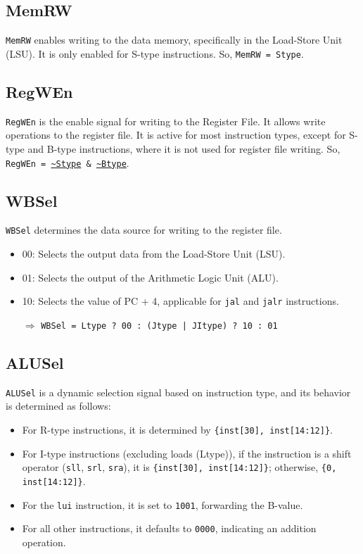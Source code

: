 \documentclass[12pt,a4paper,oneside]{book} %
\begin{document}
\subsection*{MemRW}
\texttt{MemRW} enables writing to the data memory, specifically in the Load-Store Unit (LSU). It is only enabled for S-type instructions. So, \texttt{MemRW = Stype}.

\subsection*{RegWEn}
\texttt{RegWEn} is the enable signal for writing to the Register File. It allows write operations to the register file. It is active for most instruction types, except for S-type and B-type instructions, where it is not used for register file writing. So, \texttt{RegWEn =  \url{~Stype} \& \url{~Btype}}.

\subsection*{WBSel}
\texttt{WBSel} determines the data source for writing to the register file.
\begin{itemize}
    \item 00: Selects the output data from the Load-Store Unit (LSU).
    \item 01: Selects the output of the Arithmetic Logic Unit (ALU).
    \item 10: Selects the value of PC + 4, applicable for \texttt{jal} and \texttt{jalr} instructions.
    \item[$\Rightarrow$] \texttt{WBSel = Ltype ? 00 : (Jtype | JItype) ? 10 : 01}
\end{itemize}

\subsection*{ALUSel}
\texttt{ALUSel} is a dynamic selection signal based on instruction type, and its behavior is determined as follows:
\begin{itemize}
    \item For R-type instructions, it is determined by \texttt{\{inst[30], inst[14:12]\}}.
    \item For I-type instructions (excluding loads (Ltype)), if the instruction is a shift operator (\texttt{sll}, \texttt{srl}, \texttt{sra}), it is \texttt{\{inst[30], inst[14:12]\}}; otherwise, \texttt{\{0, inst[14:12]\}}.
    \item For the \texttt{lui} instruction, it is set to \texttt{1001}, forwarding the B-value.
    \item For all other instructions, it defaults to \texttt{0000}, indicating an addition operation.
\end{itemize}
\end{document}
